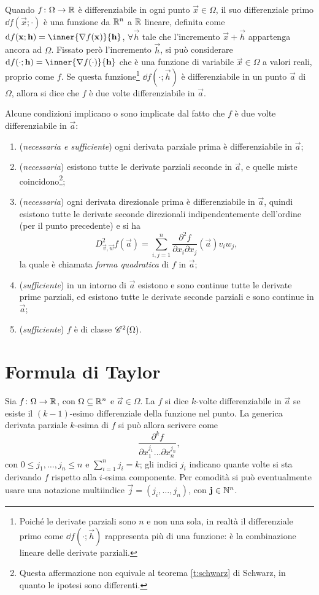 Quando $f\colon\Omega\to\R$ è differenziabile in ogni punto $\vec x\in\Omega$, il suo differenziale primo $\dd f(\vec x;\cdot)$ è una funzione da $\R^n$ a $\R$ lineare, definita come $\dd f(\vec x;\vec h)=\inner{\grad f(\vec x)}{\vec h}$, $\forall\vec h$ tale che l'incremento $\vec x+\vec h$ appartenga ancora ad $\Omega$. Fissato però l'incremento $\vec h$, si può considerare $\dd f(\cdot;\vec h)=\inner{\grad f(\cdot)}{\vec h}$ che è una funzione di variabile $\vec x\in\Omega$ a valori reali, proprio come $f$. Se questa funzione\footnote{Poiché le derivate parziali sono $n$ e non una sola, in realtà il differenziale primo come $\dd f(\cdot;\vec h)$ rappresenta più di una funzione: è la combinazione lineare delle derivate parziali.} $\dd f(\cdot;\vec h)$ è differenziabile in un punto $\vec a$ di $\Omega$, allora si dice che $f$ è due volte differenziabile in $\vec a$.

Alcune condizioni implicano o sono implicate dal fatto che $f$ è due volte differenziabile in $\vec a$:
\begin{enumerate}
\item (\textit{necessaria e sufficiente}) ogni derivata parziale prima è differenziabile in $\vec a$;
\item (\textit{necessaria}) esistono tutte le derivate parziali seconde in $\vec a$, e quelle miste coincidono\footnote{Questa affermazione non equivale al teorema \ref{t:schwarz} di Schwarz, in quanto le ipotesi sono differenti.};
\item (\textit{necessaria}) ogni derivata direzionale prima è differenziabile in $\vec a$, quindi esistono tutte le derivate seconde direzionali indipendentemente dell'ordine (per il punto precedente) e si ha
\[
D^2_{\vec v,\vec w}f(\vec a)=\sum_{i,j=1}^n\frac{\partial^2f}{\partial x_i\partial x_j}(\vec a)v_iw_j,
\]
la quale è chiamata \emph{forma quadratica} di $f$ in $\vec a$;
\item (\textit{sufficiente}) in un intorno di $\vec a$ esistono e sono continue tutte le derivate prime parziali, ed esistono tutte le derivate seconde parziali e sono continue in $\vec a$;
\item (\textit{sufficiente}) $f$ è di classe $\cont[2]{\Omega}$.
\end{enumerate}

\section{Formula di Taylor}
Sia $f\colon\Omega\to\R$, con $\Omega\subseteq\R^n$ e $\vec a\in\Omega$. La $f$ si dice $k$-volte differenziabile in $\vec a$ se esiste il $(k-1)$-esimo differenziale della funzione nel punto.
La generica derivata parziale $k$-esima di $f$ si può allora scrivere come
\[
\frac{\partial^kf}{\partial x_1^{j_1}\dots\partial x_n^{j_n}},
\]
con $0\leq j_1,\dots,j_n\leq n$ e $\sum_{i=1}^nj_i=k$; gli indici $j_i$ indicano quante volte si sta derivando $f$ rispetto alla $i$-esima componente.
Per comodità si può eventualmente usare una notazione multiindice $\vec j=(j_i,\dots,j_n)$, con $\vec j\in\N^n$.

